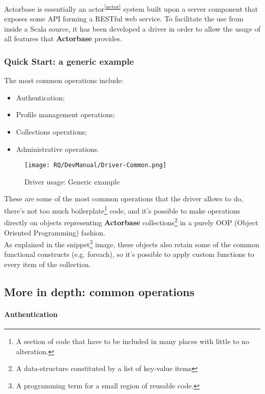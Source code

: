 \documentclass{scalatekids-article}
\begin{document}
Actorbase is essentially an actor\textsuperscript{\ref{actor}} system built upon a server component that
exposes some API forming a RESTful web service. To facilitate the use from
inside a Scala source, it has been developed a driver in order to allow the
usage of all features that \textbf{Actorbase} provides.\\

\subsubsection{Quick Start: a generic example}

The most common operations include:
\begin{itemize}
\item Authentication;
\item Profile management operations;
\item Collections operations;
\item Administrative operations.
\end{itemize}

\begin{figure}[H]
  \begin{center}
    \texttt{[image: RQ/DevManual/Driver-Common.png]}
    \caption{Driver usage: Generic example}
  \end{center}
\end{figure}

These are some of the most common operations that the driver allows to do,
there's not too much boilerplate\footnote{A section of code that have to be
  included in many places with little to no alteration.} code, and it's possible
to make operations directly on objects representing \textbf{Actorbase}
collections\footnote{A data-structure constituted by a list of key-value items\label{coll}}
in a purely OOP (Object Oriented Programming) fashion.\\ As explained in
the snippet\footnote{A programming term for a small region of reusable code.}
image, these objects also retain some of the common functional constructs (e.g.
foreach), so it's possible to apply custom functions to every item of the
collection.

\subsection{More in depth: common operations}

\paragraph{Authentication}
\end{document}
